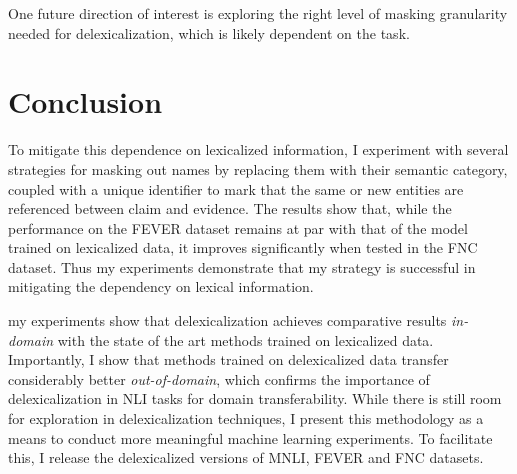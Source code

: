 \documentclass[compsoc,onecolumn]{IEEEtran}
\begin{document}
One future direction of interest is exploring the right level of masking granularity needed for delexicalization, which is likely dependent on the task. 

\section{Conclusion}
 To mitigate this dependence on lexicalized information, I experiment with several strategies for masking out names by replacing them with their semantic category, coupled with a unique identifier to mark that the same or new entities are referenced between claim and evidence. The results show that, while the performance on the FEVER dataset remains at par with that of the model trained on lexicalized data, it improves significantly when tested in the FNC dataset. Thus my experiments demonstrate that my strategy is successful in mitigating the dependency on lexical information.

my experiments show that delexicalization achieves comparative results {\em in-domain} with the state of the art methods trained on lexicalized data. Importantly, I show that methods trained on delexicalized data transfer considerably better {\em out-of-domain}, which  confirms the importance of delexicalization in NLI tasks for domain transferability. While there is still room for exploration in delexicalization techniques, I present this methodology as a means  to conduct more meaningful machine learning experiments. To facilitate this, I release the delexicalized versions of MNLI, FEVER and FNC datasets.





\balance
\begin{spacing}{0.88}
%


\end{spacing}

\end{document}
